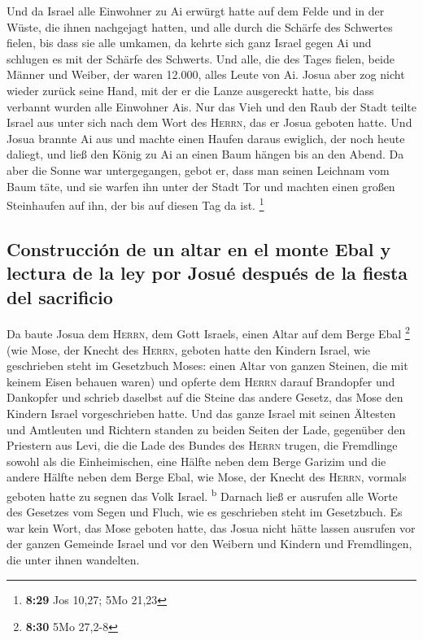  Und da Israel alle Einwohner zu Ai erwürgt hatte auf dem
Felde und in der Wüste, die ihnen nachgejagt hatten, und alle durch die
Schärfe des Schwertes fielen, bis dass sie alle umkamen, da kehrte sich
ganz Israel gegen Ai und schlugen es mit der Schärfe des Schwerts.
 Und alle, die des Tages fielen, beide Männer und Weiber,
der waren 12.000, alles Leute von Ai.  Josua aber zog
nicht wieder zurück seine Hand, mit der er die Lanze ausgereckt hatte,
bis dass verbannt wurden alle Einwohner Ais.  Nur das
Vieh und den Raub der Stadt teilte Israel aus unter sich nach dem Wort
des \textsc{Herrn}, das er Josua geboten hatte.  Und
Josua brannte Ai aus und machte einen Haufen daraus ewiglich, der noch
heute daliegt,  und ließ den König zu Ai an einen Baum
hängen bis an den Abend. Da aber die Sonne war untergegangen, gebot er,
dass man seinen Leichnam vom Baum täte, und sie warfen ihn unter der
Stadt Tor und machten einen großen Steinhaufen auf ihn, der bis auf
diesen Tag da ist. \footnote{\textbf{8:29} Jos 10,27; 5Mo 21,23}

\hypertarget{construcciuxf3n-de-un-altar-en-el-monte-ebal-y-lectura-de-la-ley-por-josuuxe9-despuuxe9s-de-la-fiesta-del-sacrificio}{%
\subsection{Construcción de un altar en el monte Ebal y lectura de la
ley por Josué después de la fiesta del
sacrificio}\label{construcciuxf3n-de-un-altar-en-el-monte-ebal-y-lectura-de-la-ley-por-josuuxe9-despuuxe9s-de-la-fiesta-del-sacrificio}}

 Da baute Josua dem \textsc{Herrn}, dem Gott Israels,
einen Altar auf dem Berge Ebal \footnote{\textbf{8:30} 5Mo 27,2-8}
 (wie Mose, der Knecht des \textsc{Herrn}, geboten hatte
den Kindern Israel, wie geschrieben steht im Gesetzbuch Moses: einen
Altar von ganzen Steinen, die mit keinem Eisen behauen waren) und
opferte dem \textsc{Herrn} darauf Brandopfer und Dankopfer
 und schrieb daselbst auf die Steine das andere Gesetz,
das Mose den Kindern Israel vorgeschrieben hatte.  Und
das ganze Israel mit seinen Ältesten und Amtleuten und Richtern standen
zu beiden Seiten der Lade, gegenüber den Priestern aus Levi, die die
Lade des Bundes des \textsc{Herrn} trugen, die Fremdlinge sowohl als die
Einheimischen, eine Hälfte neben dem Berge Garizim und die andere Hälfte
neben dem Berge Ebal, wie Mose, der Knecht des \textsc{Herrn}, vormals
geboten hatte zu segnen das Volk Israel. \textsuperscript{b}
 Darnach ließ er ausrufen alle Worte des Gesetzes vom
Segen und Fluch, wie es geschrieben steht im Gesetzbuch. 
Es war kein Wort, das Mose geboten hatte, das Josua nicht hätte lassen
ausrufen vor der ganzen Gemeinde Israel und vor den Weibern und Kindern
und Fremdlingen, die unter ihnen wandelten.

